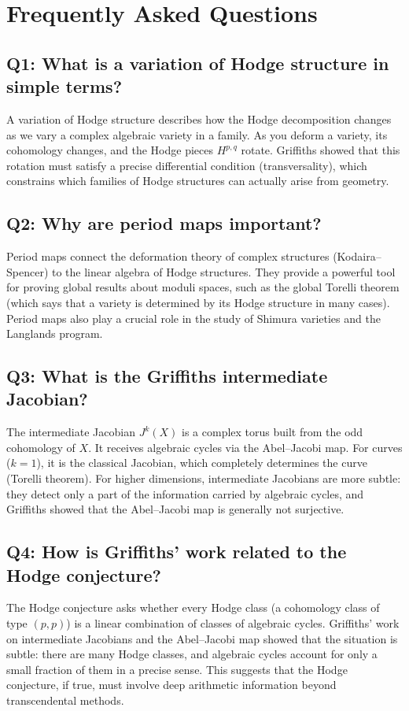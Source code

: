 \section{Frequently Asked Questions}

\subsection*{Q1: What is a variation of Hodge structure in simple terms?}
A variation of Hodge structure describes how the Hodge decomposition changes as we vary a complex algebraic variety in a family. As you deform a variety, its cohomology changes, and the Hodge pieces $H^{p,q}$ rotate. Griffiths showed that this rotation must satisfy a precise differential condition (transversality), which constrains which families of Hodge structures can actually arise from geometry.

\subsection*{Q2: Why are period maps important?}
Period maps connect the deformation theory of complex structures (Kodaira--Spencer) to the linear algebra of Hodge structures. They provide a powerful tool for proving global results about moduli spaces, such as the global Torelli theorem (which says that a variety is determined by its Hodge structure in many cases). Period maps also play a crucial role in the study of Shimura varieties and the Langlands program.

\subsection*{Q3: What is the Griffiths intermediate Jacobian?}
The intermediate Jacobian $J^k(X)$ is a complex torus built from the odd cohomology of $X$. It receives algebraic cycles via the Abel--Jacobi map. For curves ($k=1$), it is the classical Jacobian, which completely determines the curve (Torelli theorem). For higher dimensions, intermediate Jacobians are more subtle: they detect only a part of the information carried by algebraic cycles, and Griffiths showed that the Abel--Jacobi map is generally not surjective.

\subsection*{Q4: How is Griffiths' work related to the Hodge conjecture?}
The Hodge conjecture asks whether every Hodge class (a cohomology class of type $(p,p)$) is a linear combination of classes of algebraic cycles. Griffiths' work on intermediate Jacobians and the Abel--Jacobi map showed that the situation is subtle: there are many Hodge classes, and algebraic cycles account for only a small fraction of them in a precise sense. This suggests that the Hodge conjecture, if true, must involve deep arithmetic information beyond transcendental methods.

